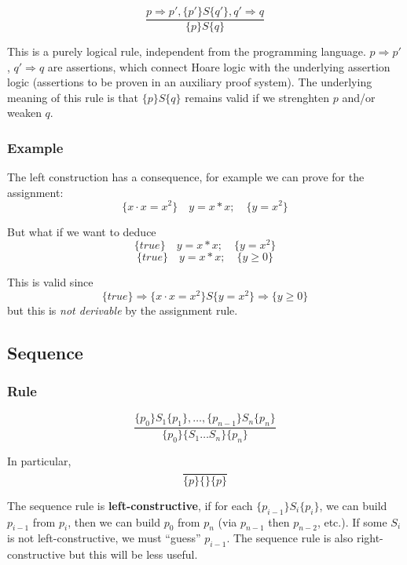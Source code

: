 \documentclass[12pt, a4paper]{book}
\begin{document}
    $$
    \frac{ p \Rightarrow p' , \{ p' \} S \{ q' \} , q' \Rightarrow q }
    { \{ p \} S \{ q \} }
    $$

    This is a purely logical rule, independent from the programming language.
    $p \Rightarrow p'$, $q' \Rightarrow q$ are assertions, which connect Hoare
    logic with the underlying assertion logic (assertions to be proven in an
    auxiliary proof system). The underlying meaning of this rule is that
     $\{ p \} S \{ q \}$ remains valid if we strenghten $p$ and/or weaken $q$.

    \subsubsection{Example}

    The left construction has a consequence, for example we can prove for the
    assignment:
    $$
    \{ x \cdot x = {x}^{2} \}\quad y = x * x; \quad \{ y = {x}^{2} \}
    $$

    But what if we want to deduce
    $$
    \{ true \}\quad y = x*x; \quad \{ y = {x}^{2} \}
    $$
    $$
    \{ true \}\quad y = x*x; \quad \{ y \ge 0 \}
    $$

    This is valid since
    $$
    \{ true \} \Rightarrow \{ x \cdot x = {x}^{2} \} S \{ y = {x}^{2} \} \Rightarrow \{ y \ge 0 \}
    $$
    but this is \textit{not derivable} by the assignment rule.

    \subsection{Sequence}

    \subsubsection{Rule}

    $$
    \frac{ \{ {p}_{0} \} {S}_{1} \{ {p}_{1} \}, \ldots, \{ {p}_{n-1} \} {S}_{n} \{ {p}_n \} }
    { \{ {p}_{0} \} \{ {S}_{1} \ldots {S}_{n} \} \{ {p}_{n} \} }
    $$

    In particular,
    $$
    \frac{}
    { \{ p \} \{ \} \{ p \} }
    $$

    The sequence rule is \textbf{left-constructive}, if for each
    $\{ {p}_{i-1}\} {S}_{i} \{ {p}_{i} \}$, we can build ${p}_{i-1}$ from ${p}_{i}$,
    then we can build ${p}_{0}$ from ${p}_{n}$ (via ${p}_{n-1}$ then ${p}_{n-2}$,
    etc.). If some ${S}_{i}$ is not left-constructive, we must \enquote{guess}
    ${p}_{i-1}$. The sequence rule is also right-constructive but this will be
    less useful.
\end{document}
